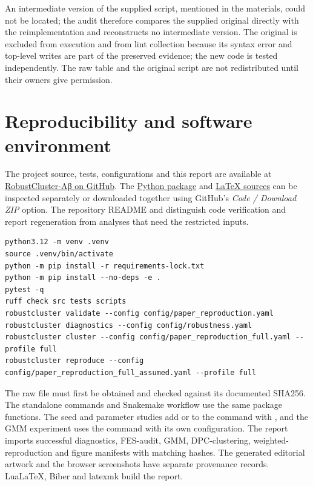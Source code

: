An intermediate version of the supplied script, mentioned in the materials, could not be located; the audit therefore compares the supplied original directly with the reimplementation and reconstructs no intermediate version. The original is excluded from execution and from lint collection because its syntax error and top-level writes are part of the preserved evidence; the new code is tested independently. The raw table and the original script are not redistributed until their owners give permission.

\chapter{Reproducibility and software environment}
\label{app:repro}
The project source, tests, configurations and this report are available at
\href{https://github.com/Alierkn/robustcluster-abeta}{RobustCluster-Aβ on GitHub}.
The \href{https://github.com/Alierkn/robustcluster-abeta/tree/main/src/robustcluster_abeta}{Python package}
and \href{https://github.com/Alierkn/robustcluster-abeta/tree/main/report}{LaTeX sources}
can be inspected separately or downloaded together using GitHub's \textit{Code / Download ZIP} option.
The repository README and  distinguish code verification and report regeneration from analyses that need the restricted inputs.

\begin{lstlisting}
python3.12 -m venv .venv
source .venv/bin/activate
python -m pip install -r requirements-lock.txt
python -m pip install --no-deps -e .
pytest -q
ruff check src tests scripts
robustcluster validate --config config/paper_reproduction.yaml
robustcluster diagnostics --config config/robustness.yaml
robustcluster cluster --config config/paper_reproduction_full.yaml --profile full
robustcluster reproduce --config config/paper_reproduction_full_assumed.yaml --profile full
\end{lstlisting}
The raw file must first be obtained and checked against its documented SHA256. The standalone commands and Snakemake workflow use the same package functions. The seed and parameter studies add  or  to the  command with , and the GMM experiment uses the  command with its own configuration. The report imports successful diagnostics, FES-audit, GMM, DPC-clustering, weighted-reproduction and figure manifests with matching hashes. The generated editorial artwork and the browser screenshots have separate provenance records. LuaLaTeX, Biber and latexmk build the report.

